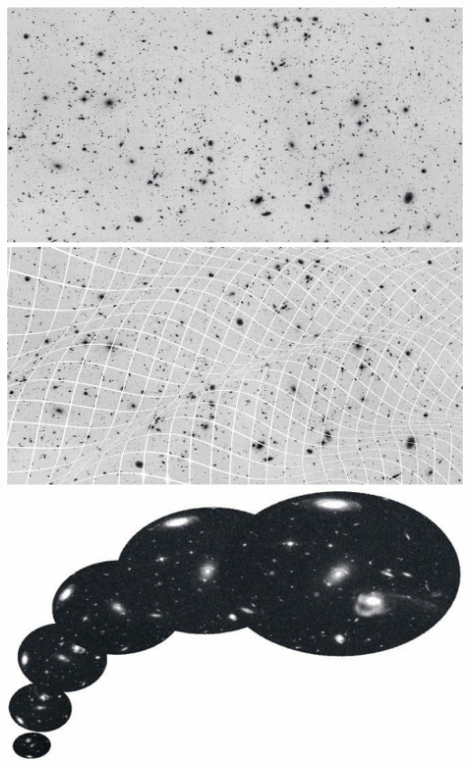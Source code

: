 	\bc
	\includegraphics[width=.9\textwidth]{img/36.jpg}\\[12pt]
	\ec	
	\bc
	\includegraphics[width=.9\textwidth]{img/37.jpg}\\[12pt]
	\ec
	\bc
	\includegraphics[width=.9\textwidth]{img/38.jpg}\\[12pt]
	\ec

\noindent
